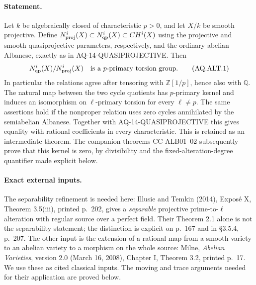 \paragraph{Statement.}
Let $k$ be algebraically closed of characteristic $p>0$,
and let $X/k$ be smooth projective.  Define
$N^i_{\rm proj}(X)\subset N^i_{\rm qp}(X)\subset CH^i(X)$
using the projective and smooth quasiprojective parameters,
respectively, and the ordinary abelian Albanese, exactly as
in AQ-14-QUASIPROJECTIVE.  Then
\[
 N^i_{\rm qp}(X)/N^i_{\rm proj}(X)
 \quad\hbox{is a $p$-primary torsion group.}               \tag{AQ.ALT.1}
\]
In particular the relations agree after tensoring with
$\mathbb Z[1/p]$, hence also with $\mathbb Q$.
The natural map between the two cycle quotients has
$p$-primary kernel and induces an isomorphism on
$\ell$-primary torsion for every $\ell\ne p$.
The same assertions hold if the nonproper relation uses
zero cycles annihilated by the semiabelian Albanese.
Together with AQ-14-QUASIPROJECTIVE this gives equality
with rational coefficients in every characteristic.
This is retained as an intermediate theorem.  The companion
theorems CC-ALB01--02 subsequently prove that this kernel
is zero, by divisibility and the fixed-alteration-degree
quantifier made explicit below.

\paragraph{Exact external inputs.}
The separability refinement is needed here: Illusie and
Temkin (2014), Expos\'e X, Theorem 3.5(iii), printed p.~202,
gives a \emph{separable} projective prime-to-$\ell$ alteration
with regular source over a perfect field.  Their
Theorem 2.1 alone is not the separability statement;
the distinction is explicit on p.~167 and in \S3.5.4,
p.~207.  The other input is the extension of a rational
map from a smooth variety to an abelian variety to a
morphism on the whole source: Milne, \emph{Abelian
Varieties}, version 2.0 (March 16, 2008), Chapter I,
Theorem 3.2, printed p.~17.  We use these as cited
classical inputs.  The moving and trace arguments
needed for their application are proved below.

